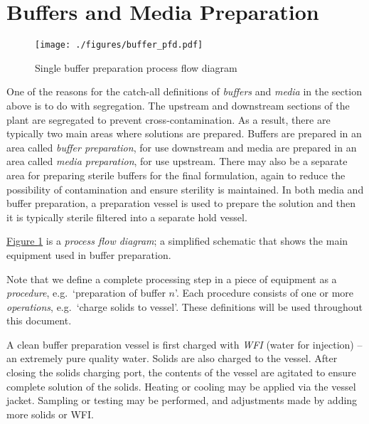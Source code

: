 \section{Buffers and Media Preparation}\label{SS.buffmedprep}
\begin{figure}
    \centering
    \texttt{[image: ./figures/buffer\_pfd.pdf]}
    \caption{Single buffer preparation process flow diagram}
    \label{fig.pfd}
\end{figure}
One of the reasons for the catch-all definitions of \emph{buffers} and
\emph{media} in the section above is to do with segregation.
The upstream and downstream sections of the plant are segregated to prevent
cross-contamination.
As a result, there are typically two main areas where solutions are prepared.
Buffers are prepared in an area called \emph{buffer preparation}, for use
downstream and media are prepared in an area called \emph{media preparation},
for use upstream.
There may also be a separate area for preparing sterile buffers for the final
formulation, again to reduce the possibility of contamination and ensure
sterility is maintained.
In both media and buffer preparation, a preparation vessel is used to prepare
the solution and then it is typically sterile filtered into a separate hold
vessel.

\hyperref[fig.pfd]{Figure \ref*{fig.pfd}} is a \emph{process flow diagram}; a
simplified schematic that shows the main equipment used in buffer preparation.

Note that we define a complete processing step in a piece of equipment as a
\emph{procedure}, e.g.\ `preparation of buffer $n$'.
Each procedure consists of one or more \emph{operations}, e.g.\ `charge solids
to vessel'.
These definitions will be used throughout this document. 

A clean buffer preparation vessel is first charged with \emph{WFI} (water for
injection) -- an extremely pure quality water.
Solids are also charged to the vessel.
After closing the solids charging port, the contents of the vessel are
agitated to ensure complete solution of the solids.
Heating or cooling may be applied via the vessel jacket.
Sampling or testing may be performed, and adjustments made by adding more 
solids or WFI.

